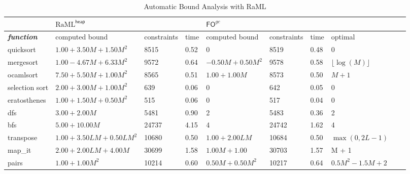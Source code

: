 \documentclass{easychair}
\newcommand{\ms}[1]{\ensuremath{\mathsf{#1}}}
\newcounter{rule}
\newcommand{\fogc}{\ms{FO}^{gc}}
\newcommand{\foheap}{\text{RaML}^{\ms{heap}}}
\theoremstyle{definition}
\begin{document}
\begin{table}[tbp]
	\begin{adjustbox}{width=1\textwidth, center=\textwidth}
  \begin{tabular}{@{}llllllllll@{}}
		\toprule
		 & \multicolumn{3}{l}{$\foheap$} & \multicolumn{3}{l}{$\fogc$} &  \\ \midrule
		 \textit{\textbf{function}} & computed bound & constraints & time & computed bound &  constraints & time & optimal \\
		 quicksort & $1.00 + 3.50M + 1.50M^2$ & 8515 & 0.52 & 0 & 8519 & 0.48 & 0 \\
		 mergesort & $1.00 - 4.67M + 6.33M^2$ & 9572 & 0.64 & $-0.50M + 0.50M^2$ & 9578 & 0.58 & $\lfloor \log(M) \rfloor$ \\
		 ocamlsort & $7.50 + 5.50M + 1.00M^2$ & 8565 & 0.51 & $1.00 + 1.00M$ & 8573 & 0.50 & $M+1$ \\
		 selection sort & $2.00 + 3.00M + 1.00M^2$ & 639 & 0.06 & 0 & 642 & 0.05 & 0 \\
		 eratosthenes & $1.00 + 1.50M + 0.50M^2$ & 515 & 0.06 & 0 & 517 & 0.04 & 0 \\
		 dfs & $3.00 + 2.00M$ & 5481 & 0.90 & 2 & 5483 & 0.36 & 2 \\
		 bfs & $5.00 + 10.00M$ & 24737 & 4.15 & 4 & 24742 & 1.62 & 4 \\
		 transpose & $1.00 + 3.50LM + 0.50LM^2$ & 10680 & 0.50 & $1.00 + 2.00LM$ & 10684 & 0.50 & $\max{(0,2L-1)}$ \\
		 map\_it & $2.00 + 2.00LM + 4.00M$ & 30699 & 1.58 & $1.00M + 1.00$ & 30703 & 1.57 & M + 1 \\
		 pairs & $1.00 + 1.00M^2$ & 10214 & 0.60 & $0.50M + 0.50M^2$ & 10217 & 0.64 & $0.5M^2-1.5M+2$ \\ \midrule
	\end{tabular}
	\end{adjustbox}
	\caption{Automatic Bound Analysis with RaML}
\label{table:bounds}
\end{table}
\end{document}
